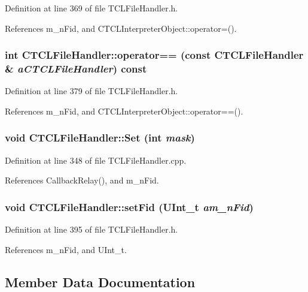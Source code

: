 Definition at line 369 of file TCLFile\-Handler.h.

References m\_\-n\-Fid, and CTCLInterpreter\-Object::operator=().
\subsubsection{\setlength{\rightskip}{0pt plus 5cm}int CTCLFile\-Handler::operator== (const CTCLFile\-Handler \& {\em a\-CTCLFile\-Handler}) const\hspace{0.3cm}{\tt  [inline]}}\label{classCTCLFileHandler_a9}




Definition at line 379 of file TCLFile\-Handler.h.

References m\_\-n\-Fid, and CTCLInterpreter\-Object::operator==().
\subsubsection{\setlength{\rightskip}{0pt plus 5cm}void CTCLFile\-Handler::Set (int {\em mask})}\label{classCTCLFileHandler_a13}




Definition at line 348 of file TCLFile\-Handler.cpp.

References Callback\-Relay(), and m\_\-n\-Fid.
\subsubsection{\setlength{\rightskip}{0pt plus 5cm}void CTCLFile\-Handler::set\-Fid ({\bf UInt\_\-t} {\em am\_\-n\-Fid})\hspace{0.3cm}{\tt  [inline]}}\label{classCTCLFileHandler_a11}




Definition at line 395 of file TCLFile\-Handler.h.

References m\_\-n\-Fid, and UInt\_\-t.

\subsection{Member Data Documentation}
